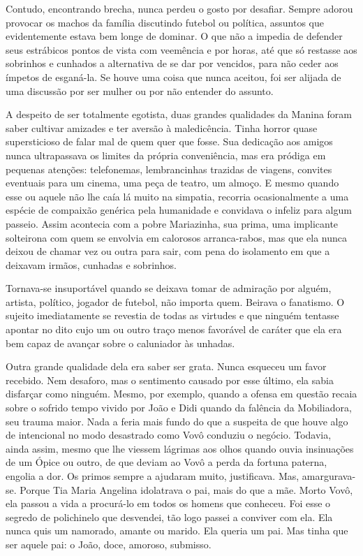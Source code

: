 Contudo, encontrando brecha, nunca perdeu o gosto por desafiar.
Sempre adorou provocar os machos da família discutindo futebol ou política, assuntos que evidentemente estava bem longe de dominar.
O que não a impedia de defender seus estrábicos pontos de vista com veemência e por horas, até que só restasse aos sobrinhos e cunhados a alternativa de se dar por vencidos, para não ceder aos ímpetos de esganá-la.
Se houve uma coisa que nunca aceitou, foi ser alijada de uma discussão por ser mulher ou por não entender do assunto.


A despeito de ser totalmente egotista, duas grandes qualidades da Manina foram saber cultivar amizades e ter aversão à maledicência.
Tinha horror quase supersticioso de falar mal de quem quer que fosse.
Sua dedicação aos amigos nunca ultrapassava os limites da própria conveniência, mas era pródiga em pequenas atenções: telefonemas, lembrancinhas trazidas de viagens, convites eventuais para um cinema, uma peça de teatro, um almoço.
E mesmo quando esse ou aquele não lhe caía lá muito na simpatia, recorria ocasionalmente a uma espécie de compaixão genérica pela humanidade e convidava o infeliz para algum passeio.
Assim acontecia com a pobre Mariazinha, sua prima, uma implicante solteirona com quem se envolvia em calorosos arranca-rabos, mas que ela nunca deixou de chamar vez ou outra para sair, com pena do isolamento em que a deixavam irmãos, cunhadas e sobrinhos.

Tornava-se insuportável quando se deixava tomar de admiração por alguém, artista, político, jogador de futebol, não importa quem.
Beirava o fanatismo.
O sujeito imediatamente se revestia de todas as virtudes e que ninguém tentasse apontar no dito cujo um ou outro traço menos favorável de caráter que ela era bem capaz de avançar sobre o caluniador às unhadas.
 
Outra grande qualidade dela era saber ser grata.
Nunca esqueceu um favor recebido.
Nem desaforo, mas o sentimento causado por esse último, ela sabia disfarçar como ninguém.
Mesmo, por exemplo, quando a ofensa em questão recaia sobre o sofrido tempo vivido por João e Didi quando da falência da Mobiliadora, seu trauma maior.
Nada a feria mais fundo do que a suspeita de que houve algo de intencional no modo desastrado como Vovô conduziu o negócio.
Todavia, ainda assim, mesmo que lhe viessem lágrimas aos olhos quando ouvia insinuações de um Ópice ou outro, de que deviam ao Vovô a perda da fortuna paterna, engolia a dor.
Os primos sempre a ajudaram muito, justificava.
Mas, amargurava-se.
Porque Tia Maria Angelina idolatrava o pai, mais do que a mãe.
Morto Vovô, ela passou a vida a procurá-lo em todos os homens que conheceu.
Foi esse o segredo de polichinelo que desvendei, tão logo passei a conviver com ela.
Ela nunca quis um namorado, amante ou marido.
Ela queria um pai.
Mas tinha que ser aquele pai: o João, doce, amoroso, submisso.

